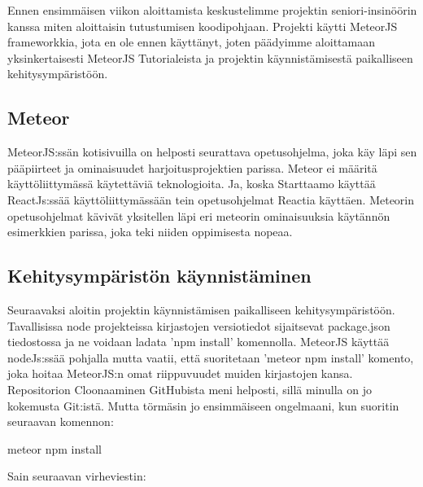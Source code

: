 
Ennen ensimmäisen viikon aloittamista keskustelimme projektin seniori-insinöörin kanssa miten aloittaisin tutustumisen koodipohjaan.
Projekti käytti MeteorJS frameworkkia, jota en ole ennen käyttänyt, joten päädyimme aloittamaan yksinkertaisesti MeteorJS Tutorialeista ja projektin käynnistämisestä paikalliseen kehitysympäristöön.\medskip

\subsection*{Meteor}

MeteorJS:ssän kotisivuilla on helposti seurattava opetusohjelma, joka käy läpi sen pääpiirteet ja ominaisuudet harjoitusprojektien parissa. 
Meteor ei määritä käyttöliittymässä käytettäviä teknologioita. Ja, koska Starttaamo käyttää ReactJs:ssää käyttöliittymässään tein opetusohjelmat Reactia käyttäen.
Meteorin opetusohjelmat kävivät yksitellen läpi eri meteorin ominaisuuksia käytännön esimerkkien parissa, joka teki niiden oppimisesta nopeaa.\medskip




\subsection*{Kehitysympäristön käynnistäminen}

Seuraavaksi aloitin projektin käynnistämisen paikalliseen kehitysympäristöön.
Tavallisissa node projekteissa kirjastojen versiotiedot sijaitsevat package.json tiedostossa ja ne voidaan ladata 'npm install' komennolla.
MeteorJS käyttää nodeJs:ssää pohjalla mutta vaatii, että suoritetaan 'meteor npm install' komento, joka hoitaa MeteorJS:n omat riippuvuudet muiden kirjastojen kansa.
Repositorion Cloonaaminen GitHubista meni helposti, sillä minulla on jo kokemusta Git:istä. Mutta törmäsin jo ensimmäiseen ongelmaani, kun suoritin seuraavan komennon:

\begin{tcolorbox}
meteor npm install
\end{tcolorbox}
\medskip



Sain seuraavan virheviestin:


